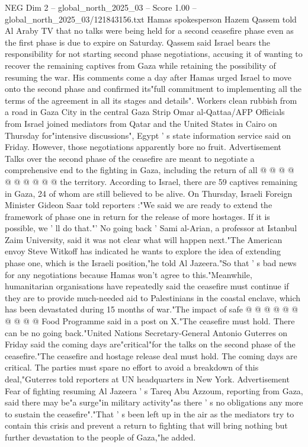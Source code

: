 \begin{textsample}{NEG Dim 2 – global\_north\_2025\_03 – Score 1.00 – global\_north\_2025\_03/121843156.txt}  \label{ex:f2_neg_030}
Hamas spokesperson Hazem Qassem told Al Araby TV that no talks were being held for a second ceasefire phase even as the first phase is due to expire on Saturday.
Qassem said Israel bears the responsibility for not starting second phase negotiations, accusing it of wanting to recover the remaining captives from Gaza while retaining the possibility of resuming the war.
His comments come a day after Hamas urged Israel to move onto the second phase and confirmed its"full commitment to implementing all the terms of the agreement in all its stages and details".
Workers clean rubbish from a road in Gaza City in the central Gaza Strip Omar al-Qattaa/AFP Officials from Israel joined mediators from Qatar and the United States in Cairo on Thursday for"intensive discussions", Egypt ' s state information service said on Friday.
However, those negotiations apparently bore no fruit.
Advertisement Talks over the second phase of the ceasefire are meant to negotiate a comprehensive end to the fighting in Gaza, including the return of all @ @ @ @ @ @ @ @ @ @ the territory.
According to Israel, there are 59 captives remaining in Gaza, 24 of whom are still believed to be alive.
On Thursday, Israeli Foreign Minister Gideon Saar told reporters :"We said we are ready to extend the framework of phase one in return for the release of more hostages.
If it is possible, we ' ll do that."' No going back ' Sami al-Arian, a professor at Istanbul Zaim University, said it was not clear what will happen next."The American envoy Steve Witkoff has indicated he wants to explore the idea of extending phase one, which is the Israeli position,"he told Al Jazeera."So that ' s bad news for any negotiations because Hamas won't agree to this."Meanwhile, humanitarian organisations have repeatedly said the ceasefire must continue if they are to provide much-needed aid to Palestinians in the coastal enclave, which has been devastated during 15 months of war."The impact of safe @ @ @ @ @ @ @ @ @ @ Food Programme said in a post on X."The ceasefire must hold.
There can be no going back."United Nations Secretary-General Antonio Guterres on Friday said the coming days are"critical"for the talks on the second phase of the ceasefire."The ceasefire and hostage release deal must hold.
The coming days are critical.
The parties must spare no effort to avoid a breakdown of this deal,"Guterres told reporters at UN headquarters in New York.
Advertisement Fear of fighting resuming Al Jazeera ' s Tareq Abu Azzoum, reporting from Gaza, said there may be"a surge"in military activity"as there ' s no obligations any more to sustain the ceasefire"."That ' s been left up in the air as the mediators try to contain this crisis and prevent a return to fighting that will bring nothing but further devastation to the people of Gaza,"he added.

\end{textsample}
